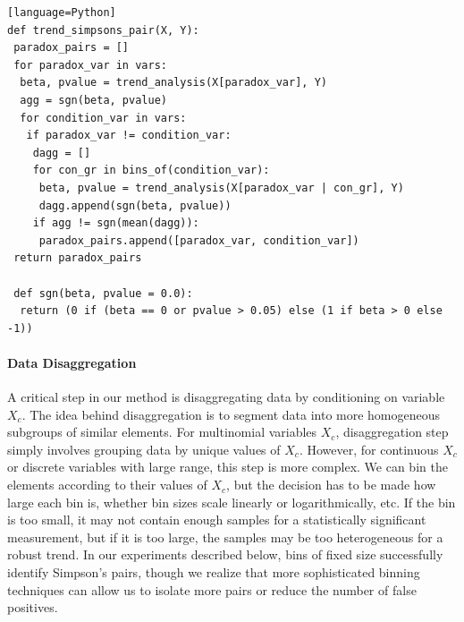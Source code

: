 

\begin{lstlisting}[title=Trend Simpson's Paradox Algorithm][language=Python]
def trend_simpsons_pair(X, Y):
 paradox_pairs = []
 for paradox_var in vars:
  beta, pvalue = trend_analysis(X[paradox_var], Y)
  agg = sgn(beta, pvalue)
  for condition_var in vars:
   if paradox_var != condition_var:
    dagg = []
    for con_gr in bins_of(condition_var):
     beta, pvalue = trend_analysis(X[paradox_var | con_gr], Y)
     dagg.append(sgn(beta, pvalue))
    if agg != sgn(mean(dagg)):
     paradox_pairs.append([paradox_var, condition_var])
 return paradox_pairs

 def sgn(beta, pvalue = 0.0):
  return (0 if (beta == 0 or pvalue > 0.05) else (1 if beta > 0 else -1))
\end{lstlisting}

\paragraph{Data Disaggregation}
A critical step in our method is disaggregating data by conditioning on variable $X_c$. The idea behind disaggregation is to segment data into more homogeneous subgroups of similar elements. For multinomial variables $X_c$, disaggregation step simply involves grouping data by unique values of $X_c$. However, for continuous $X_c$ or discrete variables with large range, this step is more complex. We can bin the elements according to their values of $X_c$, but the decision has to be made how large each bin is, whether bin sizes scale linearly or logarithmically, etc. If the bin is too small, it may not contain enough samples for a statistically significant measurement, but if it is too large, the samples may be too heterogeneous for a robust trend. %
{In our experiments described below, bins of fixed size successfully identify Simpson's pairs, though we realize that more sophisticated binning techniques can allow us to isolate more pairs or reduce the number of false positives.}

